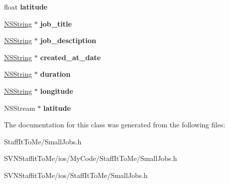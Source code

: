 \begin{DoxyCompactItemize}
\item 
\hypertarget{interface_small_jobs_a63c5a3e81acde8f4e1ff9409fa09a911}{
float {\bfseries latitude}}
\label{interface_small_jobs_a63c5a3e81acde8f4e1ff9409fa09a911}

\item 
\hypertarget{interface_small_jobs_a207ef5b3fff7083c59b679a159f559d7}{
\hyperlink{class_n_s_string}{\-N\-S\-String} $\ast$ {\bfseries job\-\_\-title}}
\label{interface_small_jobs_a207ef5b3fff7083c59b679a159f559d7}

\item 
\hypertarget{interface_small_jobs_abb58c824ba8f22f795253deac27d460d}{
\hyperlink{class_n_s_string}{\-N\-S\-String} $\ast$ {\bfseries job\-\_\-desctiption}}
\label{interface_small_jobs_abb58c824ba8f22f795253deac27d460d}

\item 
\hypertarget{interface_small_jobs_a16ab9eb6a42cedae2875eab02e98f6c5}{
\hyperlink{class_n_s_string}{\-N\-S\-String} $\ast$ {\bfseries created\-\_\-at\-\_\-date}}
\label{interface_small_jobs_a16ab9eb6a42cedae2875eab02e98f6c5}

\item 
\hypertarget{interface_small_jobs_a13ce408283f8ba84109fd968e3883e2f}{
\hyperlink{class_n_s_string}{\-N\-S\-String} $\ast$ {\bfseries duration}}
\label{interface_small_jobs_a13ce408283f8ba84109fd968e3883e2f}

\item 
\hypertarget{interface_small_jobs_adfdcf9f41b65dcd4d76cdbd7fd0e461e}{
\hyperlink{class_n_s_string}{\-N\-S\-String} $\ast$ {\bfseries longitude}}
\label{interface_small_jobs_adfdcf9f41b65dcd4d76cdbd7fd0e461e}

\item 
\hypertarget{interface_small_jobs_aebdaed24791df08090afe4ab21c947f4}{
\-N\-S\-Stream $\ast$ {\bfseries latitude}}
\label{interface_small_jobs_aebdaed24791df08090afe4ab21c947f4}

\end{DoxyCompactItemize}


\-The documentation for this class was generated from the following files\-:\begin{DoxyCompactItemize}
\item 
\-Staff\-It\-To\-Me/\-Small\-Jobs.\-h\item 
\-S\-V\-N\-Staffit\-To\-Me/ios/\-My\-Code/\-Staff\-It\-To\-Me/\-Small\-Jobs.\-h\item 
\-S\-V\-N\-Staffit\-To\-Me/ios/\-Staff\-It\-To\-Me/\-Small\-Jobs.\-h\end{DoxyCompactItemize}

